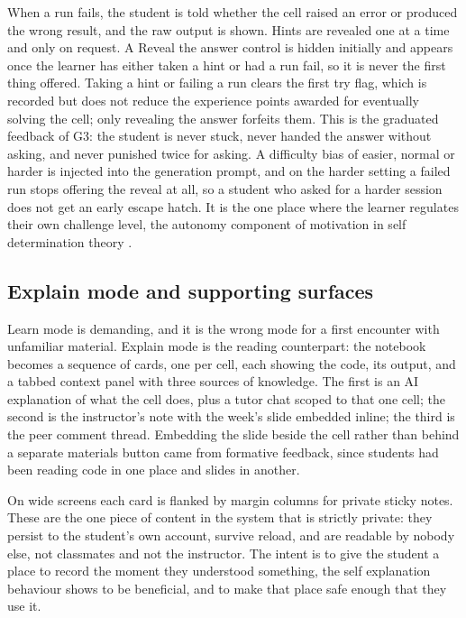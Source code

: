 \documentclass[manuscript]{acmart}
\begin{document}
When a run fails, the student is told whether the cell raised an error or
produced the wrong result, and the raw output is shown. Hints are revealed one
at a time and only on request. A Reveal the answer control is hidden initially
and appears once the learner has either taken a hint or had a run fail, so it
is never the first thing offered. Taking a hint or failing a run clears the
first try flag, which is recorded but does not reduce the experience points
awarded for eventually solving the cell; only revealing the answer forfeits
them. This is the graduated feedback of G3: the student is never stuck, never
handed the answer without asking, and never punished twice for asking. A
difficulty bias of easier, normal or harder is injected into the generation
prompt, and on the harder setting a failed run stops offering the reveal at
all, so a student who asked for a harder session does not get an early escape
hatch. It is the one place where the learner regulates their own challenge
level, the autonomy component of motivation in self determination theory
\cite{ryan2000selfdetermination}.

\subsection{Explain mode and supporting surfaces}

Learn mode is demanding, and it is the wrong mode for a first encounter with
unfamiliar material. Explain mode is the reading counterpart: the notebook
becomes a sequence of cards, one per cell, each showing the code, its output,
and a tabbed context panel with three sources of knowledge. The first is an AI
explanation of what the cell does, plus a tutor chat scoped to that one cell;
the second is the instructor's note with the week's slide embedded inline; the
third is the peer comment thread. Embedding the slide
beside the cell rather than behind a separate materials button came from
formative feedback, since students had been reading code in one place and
slides in another.

On wide screens each card is flanked by margin columns for private sticky
notes. These are the one piece of content in the system that is strictly
private: they persist to the student's own account, survive reload, and are
readable by nobody else, not classmates and not the instructor. The intent is
to give the student a place to record the moment they understood something, the
self explanation behaviour \cite{chi1994eliciting} shows to be beneficial, and
to make that place safe enough that they use it.
\end{document}

